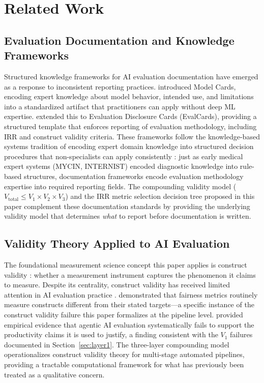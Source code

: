 \documentclass[preprint,12pt]{elsarticle}
\newcommand{\vtot}{V_{\text{total}}}
\begin{document}
\section{Related Work}
\label{sec:related}

\subsection{Evaluation Documentation and Knowledge Frameworks}

Structured knowledge frameworks for AI evaluation documentation have emerged as a
response to inconsistent reporting practices. \citet{mitchell2019} introduced Model
Cards, encoding expert knowledge about model behavior, intended use, and limitations
into a standardized artifact that practitioners can apply without deep ML expertise.
\citet{dhar2025} extended this to Evaluation Disclosure Cards (EvalCards), providing
a structured template that enforces reporting of evaluation methodology, including IRR
and construct validity criteria. These frameworks follow the knowledge-based systems
tradition of encoding expert domain knowledge into structured decision procedures that
non-specialists can apply consistently \citep{hayes1983,buchanan1984}: just as early
medical expert systems (MYCIN, INTERNIST) encoded diagnostic knowledge into rule-based
structures, documentation frameworks encode evaluation methodology expertise into
required reporting fields. The compounding validity model ($\vtot \leq V_1 \times V_2
\times V_3$) and the IRR metric selection decision tree proposed in this paper
complement these documentation standards by providing the underlying validity model
that determines \emph{what} to report before documentation is written.

\subsection{Validity Theory Applied to AI Evaluation}

The foundational measurement science concept this paper applies is construct
validity \citep{cronbach1955}: whether a measurement instrument captures the
phenomenon it claims to measure. Despite its centrality, construct validity has
received limited attention in AI evaluation practice \citep{liu2024}.
\citet{jacobs2021} demonstrated that fairness metrics routinely measure constructs
different from their stated targets---a specific instance of the construct validity
failure this paper formalizes at the pipeline level. \citet{meimandi2025} provided
empirical evidence that agentic AI evaluation systematically fails to support the
productivity claims it is used to justify, a finding consistent with the $V_1$
failures documented in Section~\ref{sec:layer1}. The three-layer compounding model
operationalizes construct validity theory for multi-stage automated pipelines,
providing a tractable computational framework for what has previously been treated
as a qualitative concern.
\end{document}
